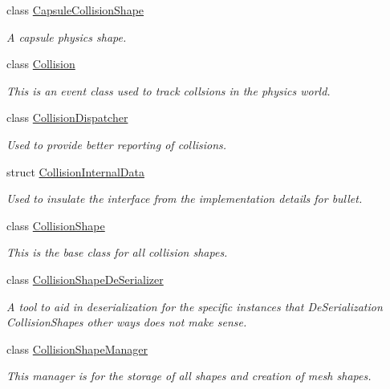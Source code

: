 \begin{DoxyCompactItemize}
class \hyperlink{classMezzanine_1_1CapsuleCollisionShape}{CapsuleCollisionShape}
\begin{DoxyCompactList}\small\item\em A capsule physics shape. \item\end{DoxyCompactList}\item 
class \hyperlink{classMezzanine_1_1Collision}{Collision}
\begin{DoxyCompactList}\small\item\em This is an event class used to track collsions in the physics world. \item\end{DoxyCompactList}\item 
class \hyperlink{classMezzanine_1_1CollisionDispatcher}{CollisionDispatcher}
\begin{DoxyCompactList}\small\item\em Used to provide better reporting of collisions. \item\end{DoxyCompactList}\item 
struct \hyperlink{structMezzanine_1_1CollisionInternalData}{CollisionInternalData}
\begin{DoxyCompactList}\small\item\em Used to insulate the interface from the implementation details for bullet. \item\end{DoxyCompactList}\item 
class \hyperlink{classMezzanine_1_1CollisionShape}{CollisionShape}
\begin{DoxyCompactList}\small\item\em This is the base class for all collision shapes. \item\end{DoxyCompactList}\item 
class \hyperlink{classMezzanine_1_1CollisionShapeDeSerializer}{CollisionShapeDeSerializer}
\begin{DoxyCompactList}\small\item\em A tool to aid in deserialization for the specific instances that DeSerialization CollisionShapes other ways does not make sense. \item\end{DoxyCompactList}\item 
class \hyperlink{classMezzanine_1_1CollisionShapeManager}{CollisionShapeManager}
\begin{DoxyCompactList}\small\item\em This manager is for the storage of all shapes and creation of mesh shapes. \item\end{DoxyCompactList}\item 

\end{DoxyCompactItemize}
